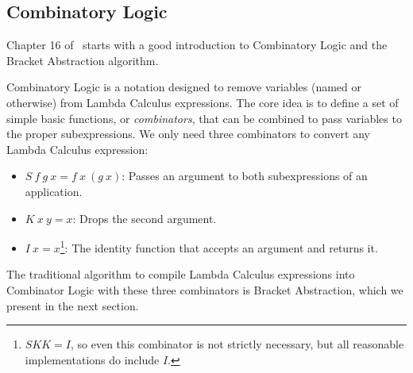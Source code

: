 \documentclass[conference]{IEEEtran}
\begin{document}
%
%
%
\subsection{Combinatory Logic}
Chapter 16 of~\cite{spj_impl} starts with a good introduction to Combinatory Logic and the Bracket Abstraction algorithm.

Combinatory Logic is a notation designed to remove variables (named or otherwise) from Lambda Calculus expressions.
The core idea is to define a set of simple basic functions, or \emph{combinators}, that can be combined to pass variables to the proper subexpressions.
We only need three combinators to convert any Lambda Calculus expression:
\begin{itemize}
    \item $S \ f \ g \ x = f \ x \ (g \ x)$: Passes an argument to both subexpressions of an application.
    \item $K \ x \ y = x$: Drops the second argument.
    \item $I \ x = x$\footnote{$SKK = I$, so even this combinator is not strictly necessary, but all reasonable implementations do include $I$.}: The identity function that accepts an argument and returns it.
\end{itemize}

The traditional algorithm to compile Lambda Calculus expressions into Combinator Logic with these three combinators is Bracket Abstraction, which we present in the next section.
\end{document}
